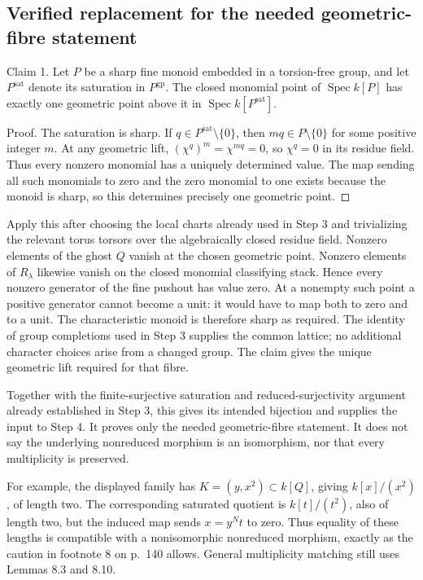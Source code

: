 \documentclass[10pt]{article}
\begin{document}
\subsection*{Verified replacement for the needed geometric-fibre statement}
Claim 1.  Let \(P\) be a sharp fine monoid embedded in a torsion-free group, and let \(P^\mathrm{sat}\) denote its saturation in \(P^\mathrm{gp}\). The closed monomial point of \(\operatorname{Spec}k[P]\) has exactly one geometric point above it in \(\operatorname{Spec}k[P^\mathrm{sat}]\).\par
Proof. The saturation is sharp. If \(q\in P^\mathrm{sat}\setminus\{0\}\), then \(mq\in P\setminus\{0\}\) for some positive integer \(m\). At any geometric lift, \((\chi^q)^m=\chi^{mq}=0\), so \(\chi^q=0\) in its residue field. Thus every nonzero monomial has a uniquely determined value. The map sending all such monomials to zero and the zero monomial to one exists because the monoid is sharp, so this determines precisely one geometric point. ◻\par
Apply this after choosing the local charts already used in Step 3 and trivializing the relevant torus torsors over the algebraically closed residue field. Nonzero elements of the ghost \(Q\) vanish at the chosen geometric point. Nonzero elements of \(R_\lambda\) likewise vanish on the closed monomial classifying stack. Hence every nonzero generator of the fine pushout has value zero. At a nonempty such point a positive generator cannot become a unit: it would have to map both to zero and to a unit. The characteristic monoid is therefore sharp as required. The identity of group completions used in Step 3 supplies the common lattice; no additional character choices arise from a changed group. The claim gives the unique geometric lift required for that fibre.\par
Together with the finite-surjective saturation and reduced-surjectivity argument already established in Step 3, this gives its intended bijection and supplies the input to Step 4. It proves only the needed geometric-fibre statement. It does not say the underlying nonreduced morphism is an isomorphism, nor that every multiplicity is preserved.\par
For example, the displayed family has \(K=(y,x^2)\subset k[Q]\), giving \(k[x]/(x^2)\), of length two. The corresponding saturated quotient is \(k[t]/(t^2)\), also of length two, but the induced map sends \(x=y^Nt\) to zero. Thus equality of these lengths is compatible with a nonisomorphic nonreduced morphism, exactly as the caution in footnote 8 on p. 140 allows. General multiplicity matching still uses Lemmas 8.3 and 8.10.\par
\end{document}

